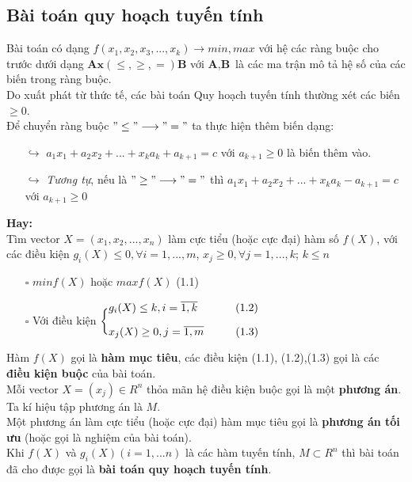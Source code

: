 \documentclass{article}
\begin{document}
\subsection{Bài toán quy hoạch tuyến tính}
\large
\hspace{0.4cm} Bài toán có dạng $f(x_1,x_2,x_3,...,x_k) \longrightarrow min, max$ với hệ các ràng buộc cho trước dưới dạng $\textbf{Ax}(\leq, \geq, =)\textbf{B}$ với $\textbf{A}, \textbf{B}$ là các ma trận mô tả hệ số của các biến trong ràng buộc.\medskip \\ 
\indent Do xuất phát từ thức tế, các bài toán Quy hoạch tuyến tính thường xét các biến $\geq 0$.\medskip \\ 
\indent Để chuyển ràng buộc $"\leq" \longrightarrow "=" $ ta thực hiện thêm biến dạng:
\begin{itemize}
    \item [$\hookrightarrow$] $a_1x_1 + a_2x_2 +... +x_ka_k + \boxed{a_{k+1}} = c$ với $a_{k+1}\geq 0$ là biến thêm vào.
    \item [$\hookrightarrow$] \textit{Tương tự}, nếu là $"\geq" \longrightarrow "="$ thì $a_1x_1 + a_2x_2 +... +x_ka_k - \boxed{a_{k+1}} = c$ với $a_{k+1}\geq 0$ 
\end{itemize}
\indent \textbf{Hay:} \medskip \\ 
\indent Tìm vector $X = (x_1, x_2,..., x_n)$ làm cực tiểu (hoặc cực đại) hàm số $f(X)$, với các điều kiện $g_i(X) \leq 0, \forall i=1,...,m$, $x_j \geq 0, \forall j=1,...,k$; $k\leq n$
\begin{itemize}
    \item [$\square$] $minf(X) \text{ hoặc } max f(X)$ \hspace{3.3cm} (1.1)
    \item [$\square$] Với điều kiện $\bigg\{^{\displaystyle g_i(X)\leq k, i = \overline{1,k}\hspace{1.2cm} (1.2)}_{\displaystyle x_j(X)\geq 0, j=\overline{1,m}\hspace{1cm} (1.3)}$ 
\end{itemize}
\hspace{0.4cm} Hàm $f(X)$ gọi là \textbf{hàm mục tiêu}, các điều kiện (1.1), (1.2),(1.3) gọi là các \textbf{điều kiện buộc} của bài toán. \medskip \\
\indent Mỗi vector $X=(x_j)\in R^n$ thỏa mãn hệ điều kiện buộc gọi là một \textbf{phương án}. Ta kí hiệu tập phương án là $M$. \medskip \\
\indent Một phương án làm cực tiểu (hoặc cực đại) hàm mục tiêu gọi là\textbf{ phương án tối ưu} (hoặc gọi là nghiệm của bài toán).\medskip \\
\indent Khi $f(X)$ và $g_i(X)(i=1,...n)$ là các hàm tuyến tính, $M \subset R^n$ thì bài toán đã cho được gọi là \textbf{bài toán quy hoạch tuyến tính}.
\end{document}
